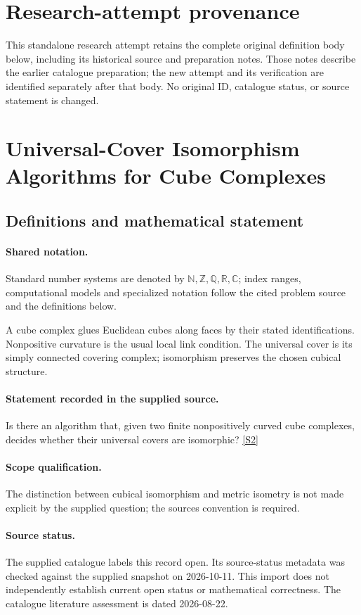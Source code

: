 \documentclass[11pt]{article}
\begin{document}
\section*{Research-attempt provenance}
This standalone research attempt retains the complete original definition body below,
including its historical source and preparation notes. Those notes describe the
earlier catalogue preparation; the new attempt and its verification are identified
separately after that body. No original ID, catalogue status, or source statement is changed.

\section{Universal-Cover Isomorphism Algorithms for Cube Complexes}\label{statement}

\subsection{Definitions and mathematical statement}

\paragraph{Shared notation.}Standard number systems are denoted by $\mathbb N,\mathbb Z,\mathbb Q,\mathbb R,\mathbb C$; index ranges, computational models and specialized notation follow the cited problem source and the definitions below.


A cube complex glues Euclidean cubes along faces by their stated identifications. Nonpositive curvature is the usual local link condition. The universal cover is its simply connected covering complex; isomorphism preserves the chosen cubical structure.
\paragraph{Statement recorded in the supplied source.}
Is there an algorithm that, given two finite nonpositively curved cube complexes, decides whether their universal covers are isomorphic? \href{https://doi.org/10.4171/owr/2026/8}{[S2]}
\paragraph{Scope qualification.}
The distinction between cubical isomorphism and metric isometry is not made explicit by the supplied question; the source\textquotesingle s convention is required.
\paragraph{Source status.}
The supplied catalogue labels this record open. Its source-status metadata was checked against the supplied snapshot on 2026-10-11. This import does not independently establish current open status or mathematical correctness. The catalogue literature assessment is dated 2026-08-22.
\end{document}

